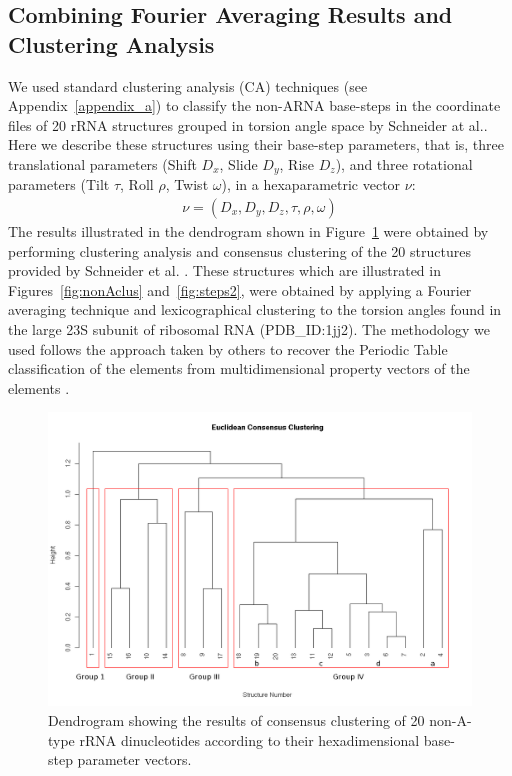 \subsection{Combining Fourier Averaging Results and Clustering Analysis}
We   used   standard   clustering   analysis  (CA)   techniques   (see
Appendix~\ref{appendix_a}) to classify  the non-ARNA base-steps in the
coordinate files of 20 rRNA  structures grouped in torsion angle space
by  Schneider  at  al.\cite{schneider2004}.  Here  we  describe  these
structures using their base-step parameters, that is, three
translational parameters  (Shift $D_x$, Slide $D_y$,  Rise $D_z$), and
three   rotational  parameters  (Tilt   $\tau$,  Roll   $\rho$,  Twist
$\omega$), in a hexaparametric vector $\nu$:
\begin{gather}
\nu = (D_x, D_y, D_z, \tau, \rho, \omega)
\end{gather}
The    results    illustrated    in    the   dendrogram    shown    in
Figure~\ref{fig:eucl_cons}  were  obtained  by  performing  clustering
analysis and consensus clustering of the 20 structures provided by
Schneider et al.   \cite{schneider2004}. These structures which
are  illustrated  in Figures~\ref{fig:nonAclus}  and~\ref{fig:steps2},
were  obtained by  applying a  Fourier averaging
technique and  lexicographical clustering to the  torsion angles found
in the large 23S subunit of ribosomal RNA (PDB\_ID:1jj2).  The methodology
we used follows  the approach taken by others  to recover the Periodic
Table  classification of the  elements from  multidimensional property
vectors of the elements \cite{restrepo2004, restrepo2006}.
\begin{figure}[htbp]
 \centering
\includegraphics[angle=90, scale=0.5]{Chapter2/eucli_cons_nonA-RNA.png}
\caption{Dendrogram showing the results  of consensus clustering of 20
non-A-type  rRNA  dinucleotides   according  to  their  hexadimensional
base-step parameter vectors.}
 \label{fig:eucl_cons}
\end{figure}

